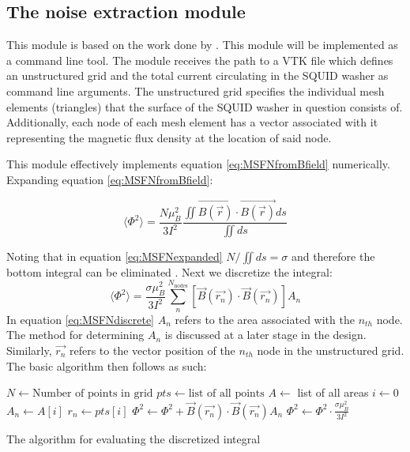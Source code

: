 \subsection{The noise extraction module}
This module is based on the work done by \cite{fluxNoiseSquidsStevenAnton}. This module will be implemented as a command line tool. The module receives the path to a VTK file which defines an unstructured grid and the total current circulating in the SQUID washer as command line arguments. The unstructured grid specifies the individual mesh elements (triangles)  that the surface of the SQUID washer in question consists of. Additionally, each node of each mesh element has a vector associated with it representing the magnetic flux density at the location of said node. \par
This module effectively implements equation \ref{eq:MSFNfromBfield} numerically. Expanding equation \ref{eq:MSFNfromBfield}:


\begin{equation}
    \langle \Phi ^2 \rangle = \frac{N\mu_B^2}{3I^2} \frac{\iint \Vec{B(\Vec{r})}\cdot\Vec{B(\Vec{r})} ds}{\iint ds}
    \label{eq:MSFNexpanded}
\end{equation}

Noting that in equation \ref{eq:MSFNexpanded} $N/\iint ds = \sigma$ and therefore the bottom integral can be eliminated \cite{fluxNoiseSquidsStevenAnton}. Next we discretize the integral: 
\begin{equation}
    \langle \Phi ^2 \rangle = \frac{\sigma\mu_B^2}{3I^2}\sum_{n}^{N_{\text{nodes}}}[\Vec{B}(\Vec{r_n})\cdot\Vec{B}(\Vec{r_n})]A_n
    \label{eq:MSFNdiscrete}
\end{equation}
In equation \ref{eq:MSFNdiscrete} $A_n$ refers to the area associated with the $n_{th}$ node. The method for determining $A_n$ is discussed at a later stage in the design. Similarly, $\Vec{r_n}$ refers to the vector position of the $n_{th}$ node in the unstructured grid. The basic algorithm then follows as such:
\begin{algorithm}
\begin{algorithmic}
    \State $N \gets \text{Number of points in grid}$
    \State $pts \gets \text{list of all points}$
    \State $A \gets $ list of all areas
    \State $i \gets 0$ 
        \State $A_n \gets A[i]$
        \State $r_n \gets pts[i]$ 
        \State $\Phi^2 \gets \Phi^2 + \Vec{B}(\Vec{r_n})\cdot \Vec{B}(\Vec{r_n}) A_n$ 
    \EndWhile
    \State $\Phi^2 \gets \Phi^2 \cdot \frac{\sigma\mu_B^2}{3I^2}$ 
\end{algorithmic}
\caption{The algorithm for evaluating the discretized integral}
\end{algorithm}

